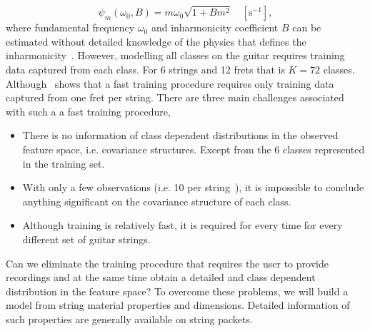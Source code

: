 \documentclass{article}
\begin{document}
\begin{sloppy}
%
\begin{equation}\label{eq:pianoModel}
  \psi_m(\omega_0,B) = m \omega_0 \sqrt{1+B m^2} \quad [\text{s}^{-1}], 
\end{equation}
where fundamental frequency $\omega_0$ and inharmonicity coefficient $B$ can be estimated without detailed knowledge of the physics that defines the inharmonicity~\cite{ hjerrild::icassp19,abesser:automatic_string_detection_ml, barbancho:inharmonicity_tablature,michelson2018_aes}. 
However, modelling all classes on the guitar requires training data captured from each class. For 6 strings and 12 frets that is $K=72$  classes. Although~\cite{hjerrild::icassp19,barbancho:inharmonicity_tablature} shows that a fast training procedure requires only training data captured from one fret per string. There are three main challenges associated with such a a fast training procedure,%
\begin{itemize}
    \item There is no information of class dependent distributions in the observed feature space, i.e. covariance structures. Except from the 6 classes represented in the training set.
    \item With only a few observations (i.e. 10 per string~\cite{hjerrild::icassp19}), it is impossible to conclude anything significant on the covariance structure of each class.
    \item Although training is relatively fast, it is required for every time for every different set of guitar strings.
\end{itemize}
Can we eliminate the training procedure that requires the user to provide recordings and at the same time obtain a detailed and class dependent distribution in the feature space? To overcome these problems, we will build a model from string material properties and dimensions. Detailed information of such properties are generally available on string packets.


\end{sloppy}
\end{document}
